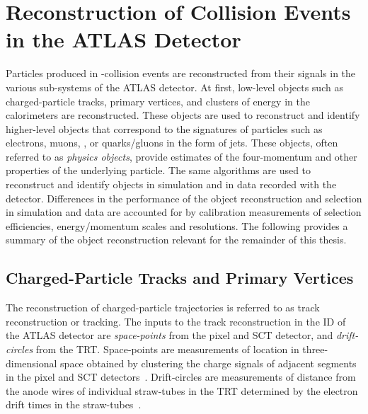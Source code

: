 \section{Reconstruction of Collision Events in the ATLAS Detector}%
\label{sec:object_reco_at_atlas}

Particles produced in \pp-collision events are reconstructed from their signals
in the various sub-systems of the ATLAS detector. At first, low-level objects
such as charged-particle tracks, primary vertices, and clusters of energy in the
calorimeters are reconstructed. These objects are used to reconstruct and
identify higher-level objects that correspond to the signatures of particles
such as electrons, muons, \tauleptons, or quarks/gluons in the form of jets.
These objects, often referred to as \emph{physics objects}, provide estimates of
the four-momentum and other properties of the underlying particle. The same
algorithms are used to reconstruct and identify objects in simulation and in
data recorded with the detector. Differences in the performance of the object
reconstruction and selection in simulation and data are accounted for by
calibration measurements of selection efficiencies, energy/momentum scales and
resolutions. The following provides a summary of the object reconstruction
relevant for the remainder of this thesis.


\subsection{Charged-Particle Tracks and Primary Vertices}

The reconstruction of charged-particle trajectories is referred to as track
reconstruction or tracking. The inputs to the track reconstruction in the ID of
the ATLAS detector are \emph{space-points} from the pixel and SCT detector, and
\emph{drift-circles} from the TRT. Space-points are measurements of location in
three-dimensional space obtained by clustering the charge signals of adjacent
segments in the pixel and SCT detectors~\cite{PERF-2015-08}. Drift-circles are
measurements of distance from the anode wires of individual straw-tubes in the
TRT determined by the electron drift times in the
straw-tubes~\cite{IDET-2015-01}.

